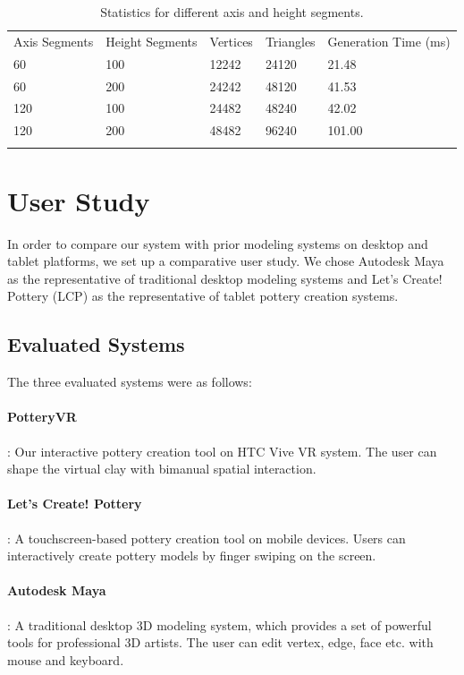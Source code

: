 \begin{table}
\caption{Statistics for different axis and height segments.}
\label{tab:1}       %
\begin{tabular}{lllll}
\hline\noalign{\smallskip}
Axis Segments & Height Segments & Vertices & Triangles & Generation Time (ms)\\
\noalign{\smallskip}\hline\noalign{\smallskip}
60 & 100 & 12242 & 24120 & 21.48 \\
60 & 200 & 24242 & 48120 & 41.53 \\
120 & 100 & 24482 & 48240 & 42.02 \\
120 & 200 & 48482 & 96240 & 101.00 \\
\noalign{\smallskip}\hline
\end{tabular}
\end{table}

\section{User Study}
\label{sec:6}
In order to compare our system with prior modeling systems on desktop and tablet platforms, we set up a comparative user study. We chose Autodesk Maya \cite{website:maya} as the representative of traditional desktop modeling systems and Let's Create! Pottery (LCP) \cite{website:letspottery} as the representative of tablet pottery creation systems.

\subsection{Evaluated Systems}
\label{sec:6.1}
The three evaluated systems were as follows:

\paragraph{PotteryVR}: Our interactive pottery creation tool on HTC Vive VR system. The user can shape the virtual clay with bimanual spatial interaction.

\paragraph{Let’s Create! Pottery}: A touchscreen-based pottery creation tool on mobile devices. Users can interactively create pottery models by finger swiping on the screen.

\paragraph{Autodesk Maya}: A traditional desktop 3D modeling system, which provides a set of powerful tools for professional 3D artists. The user can edit vertex, edge, face etc. with mouse and keyboard.

